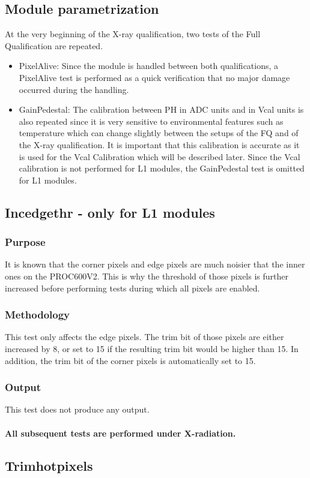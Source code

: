\documentclass[a4paper,12pt,twoside]{article}
\begin{document}
\subsection{Module parametrization}
At the very beginning of the X-ray qualification, two tests of the Full Qualification are repeated. 
\begin{itemize}
\item PixelAlive: Since the module is handled between both qualifications, a PixelAlive test is performed as a quick verification that no major damage occurred during the handling.
\item GainPedestal: The calibration between PH in ADC units and in Vcal units is also repeated since it is very sensitive to environmental features such as temperature which can change slightly between the setups of the FQ and of the X-ray qualification. It is important that this calibration is accurate as it is used for the Vcal Calibration which will be described later. Since the Vcal calibration is not performed for L1 modules, the GainPedestal test is omitted for L1 modules.
\end{itemize}
\subsection{Incedgethr - only for L1 modules}
\subsubsection{Purpose}
It is known that the corner pixels and edge pixels are much noisier that the inner ones on the PROC600V2. This is why the threshold of those pixels is further increased before performing tests during which all pixels are enabled.
\subsubsection{Methodology}
This test only affects the edge pixels. The trim bit of those pixels are either increased by 8, or set to 15 if the resulting trim bit would be higher than 15. In addition, the trim bit of the corner pixels is automatically set to 15.
\subsubsection{Output}
This test does not produce any output.
\\
\\
\textbf{All subsequent tests are performed under X-radiation.}
\subsection{Trimhotpixels}
\end{document}

